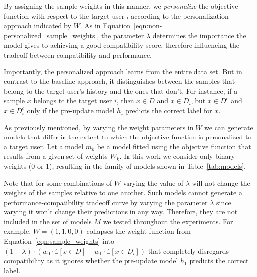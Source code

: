 \documentclass[letterpaper]{article} %
\theoremstyle{definition}
\newcommand{\kibitz}[2]{\ifnum\Comments=1{\color{#1}{#2}}\fi}
\newcommand{\ym}[1]{\kibitz{blue}{[YM:#1]}}
\newcommand{\li}[1]{\kibitz{brown}{[LL:#1]}}
\begin{document}
By assigning the sample weights in this manner, we \emph{personalize} the objective function with respect to the target user $i$ according to the personalization approach indicated by $W$. 
As in Equation~\ref{eqn:non-personalized_sample_weights}, the parameter $\lambda$ determines the importance the model gives to achieving a good compatibility score, therefore influencing the tradeoff between compatibility and performance.

Importantly, the personalized approach learns from the entire data set. But in contrast to the baseline approach, it distinguishes between the samples that belong to the target user's history and the ones that don't.
For instance, if a sample $x$ belongs to the target user $i$, then  $x\in D$ and $x\in D_i$, but $x \in D^c$ and $x\in D^c_i$ only if the pre-update model $h_1$ predicts the correct label for $x$.
%

As previously mentioned, by varying the weight parameters in $W$ we can generate models that differ in the extent to which the objective function is personalized to a target user. Let a model $m_k$ be a model fitted using the objective function that results from a given set of weights $W_k$. In this work we consider only binary weights (0 or 1), resulting in the family of models shown in Table~\ref{tab:models}.

\li{I don't understand what comes next. Once we polish this explanation we should probably move it to the end of the previous paragraph. The reader will be asking the question of where are the other models in the table 1 as soon as we mention it.}\ym{moved it, but I'm not sure how to improve it} Note that for some combinations of $W$ varying the value of  $\lambda$ will not change the weights of the samples relative to one another. Such models cannot generate a performance-compatibility tradeoff curve by varying the parameter $\lambda$ since varying it won't change their predictions in any way. Therefore, they are not included in the set of models $M$ we tested throughout the experiments. For example, $W=(1,1,0,0)$ collapses the weight function from Equation~\ref{eqn:sample_weights} into $(1-\lambda)\cdot (w_0\cdot \mathbb{1}[x\in D]+w_1\cdot \mathbb{1}[x\in D_i])$ that completely disregards compatibility as it ignores whether the pre-update model $h_1$ predicts the correct label.
\end{document}
